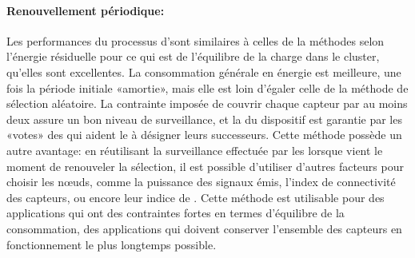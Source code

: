 \paragraph{Renouvellement périodique: \elecdem}
Les performances du processus d'\elecdem sont similaires à celles de la méthodes selon l'énergie résiduelle pour ce qui est de l'équilibre de la charge dans le cluster, \cad qu'elles sont excellentes.
La consommation générale en énergie est meilleure, une fois la période initiale «amortie», mais elle est loin d'égaler celle de la méthode de sélection aléatoire.
La contrainte imposée de couvrir chaque capteur par au moins deux \cns assure un bon niveau de surveillance, et la \secu du dispositif est garantie par les «votes» des \cns qui aident le \ch à désigner leurs successeurs.
Cette méthode possède un autre avantage: en réutilisant la surveillance effectuée par les \cns lorsque vient le moment de renouveler la sélection, il est possible d'utiliser d'autres facteurs pour choisir les nœuds, comme la puissance des signaux émis, l'index de connectivité des capteurs, ou encore leur indice de .
Cette méthode est utilisable pour des applications qui ont des contraintes fortes en termes d'équilibre de la consommation, \cad des applications qui doivent conserver l'ensemble des capteurs en fonctionnement le plus longtemps possible.

